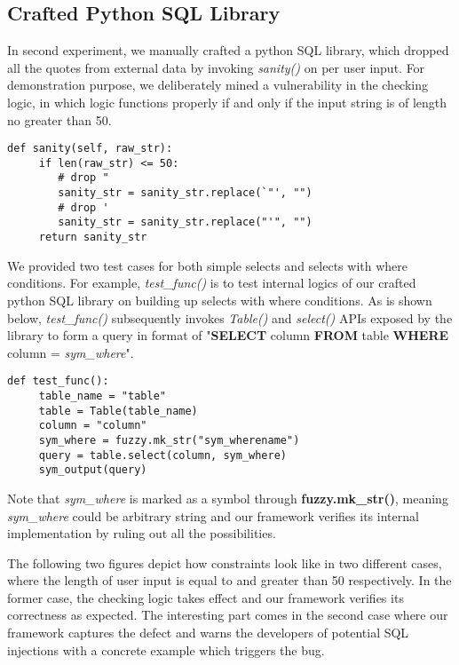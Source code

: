 \documentclass[conference]{IEEEtran}
\begin{document}
\subsection{Crafted Python SQL Library}
\label{crafted-sql}
In second experiment, we manually crafted a python SQL library, which dropped all the quotes from external data by invoking \textit{sanity()} on per user input. For demonstration purpose, we deliberately mined a vulnerability in the checking logic, in which logic functions properly if and only if the input string is of length no greater than 50.

\begin{lstlisting}[frame=single, breaklines=true]
   def sanity(self, raw_str): 
     if len(raw_str) <= 50:
        # drop "
        sanity_str = sanity_str.replace(`"', "")
        # drop '
        sanity_str = sanity_str.replace("'", "")
     return sanity_str
\end{lstlisting}

We provided two test cases for both simple selects and selects with where conditions. For example, \textit{test\_func()} is to test internal logics of our crafted python SQL library on building up selects with where conditions. As is shown below, \textit{test\_func()} subsequently invokes \textit{Table()} and \textit{select()} APIs exposed by the library to form a query in format of "\textbf{SELECT} column \textbf{FROM} table \textbf{WHERE} column = \emph{sym\_where}".

\begin{lstlisting}[frame=single, breaklines=true]
   def test_func():
     table_name = "table"
     table = Table(table_name)
     column = "column"
     sym_where = fuzzy.mk_str("sym_wherename")
     query = table.select(column, sym_where)
     sym_output(query)
\end{lstlisting}

Note that \emph{sym\_where} is marked as a symbol through \textbf{fuzzy.mk\_str()}, meaning \emph{sym\_where} could be arbitrary string and our framework verifies its internal implementation by ruling out all the possibilities.

The following two figures depict how constraints look like in two different cases, where the length of user input is equal to and greater than 50 respectively. In the former case, the checking logic takes effect and our framework verifies its correctness as expected. The interesting part comes in the second case where our framework captures the defect and warns the developers of potential SQL injections with a concrete example which triggers the bug.
\end{document}
